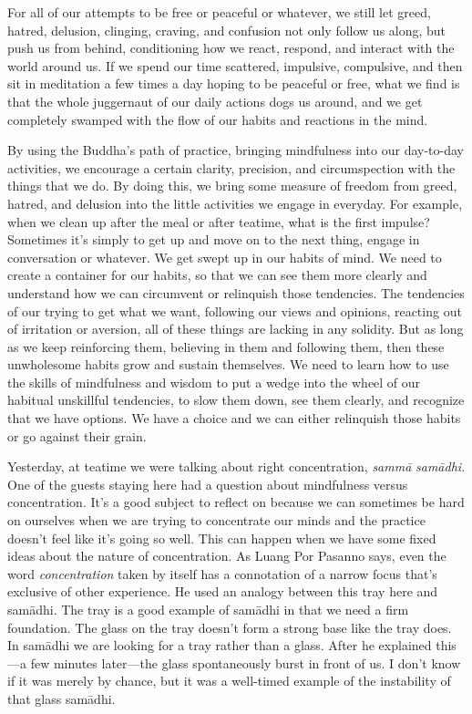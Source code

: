 For all of our attempts to be free or peaceful or whatever, we still 
let greed, hatred, delusion, clinging, craving, and confusion not only 
follow us along, but push us from behind, conditioning how we react, 
respond, and interact with the world around us. If we spend our time 
scattered, impulsive, compulsive, and then sit in meditation a few 
times a day hoping to be peaceful or free, what we find is that the 
whole juggernaut of our daily actions dogs us around, and we get 
completely swamped with the flow of our habits and reactions in the 
mind.

By using the Buddha's path of practice, bringing mindfulness into our 
day-to-day activities, we encourage a certain clarity, precision, and 
circumspection with the things that we do. By doing this, we bring some 
measure of freedom from greed, hatred, and delusion into the little 
activities we engage in everyday. For example, when we clean up after 
the meal or after teatime, what is the first impulse? Sometimes it's 
simply to get up and move on to the next thing, engage in conversation 
or whatever. We get swept up in our habits of mind. We need to create a 
container for our habits, so that we can see them more clearly and 
understand how we can circumvent or relinquish those tendencies. The 
tendencies of our trying to get what we want, following our views and 
opinions, reacting out of irritation or aversion, all of these things 
are lacking in any solidity. But as long as we keep reinforcing them, 
believing in them and following them, then these unwholesome habits 
grow and sustain themselves. We need to learn how to use the skills of 
mindfulness and wisdom to put a wedge into the wheel of our habitual 
unskillful tendencies, to slow them down, see them clearly, and 
recognize that we have options. We have a choice and we can either 
relinquish those habits or go against their grain.


Yesterday, at teatime we were talking about right concentration, 
\emph{sammā} \emph{samādhi.} One of the guests staying here had a 
question about mindfulness versus concentration. It's a good subject to 
reflect on because we can sometimes be hard on ourselves when we are 
trying to concentrate our minds and the practice doesn't feel like it's 
going so well. This can happen when we have some fixed ideas about the 
nature of concentration. As Luang Por Pasanno says, even the word 
\emph{concentration} taken by itself has a connotation of a narrow 
focus that's exclusive of other experience. He used an analogy between 
this tray here and samādhi. The tray is a good example of samādhi in 
that we need a firm foundation. The glass on the tray doesn't form a 
strong base like the tray does. In samādhi we are looking for a tray 
rather than a glass. After he explained this---a few minutes 
later---the glass spontaneously burst in front of us. I don't know if 
it was merely by chance, but it was a well-timed example of the 
instability of that glass samādhi.

